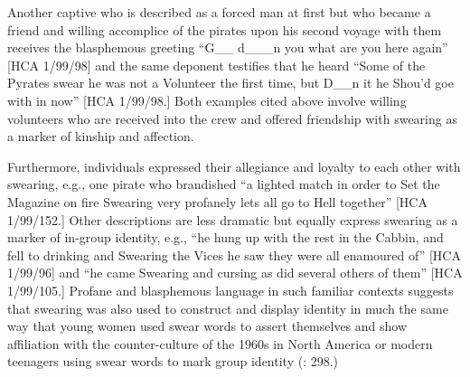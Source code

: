 Another captive who is described as a forced man at first but who became a friend and willing accomplice of the pirates upon his second voyage with them receives the blasphemous greeting “G\_\_ d\_\_\_n you what are you here again” [HCA 1/99/98] and the same deponent testifies that he heard “Some of the Pyrates swear he was not a Volunteer the first time, but D\_\_n it he Shou’d goe with in now” [HCA 1/99/98.] Both examples cited above involve willing volunteers who are received into the crew and offered friendship with swearing as a marker of kinship and affection. 

Furthermore, individuals expressed their allegiance and loyalty to each other with swearing, e.g., one pirate who brandished “a lighted match in order to Set the Magazine on fire Swearing very profanely lets all go to Hell together” [HCA 1/99/152.] Other descriptions are less dramatic but equally express swearing as a marker of in-group identity, e.g., “he hung up with the rest in the Cabbin, and fell to drinking and Swearing the Vices he saw they were all enamoured of” [HCA 1/99/96] and “he came Swearing and cursing as did several others of them” [HCA 1/99/105.] Profane and blasphemous language in such familiar contexts suggests that swearing was also used to construct and display identity in much the same way that young women used swear words to assert themselves and show affiliation with the counter-culture of the 1960s in North America \citep[60]{Carlisle2009} or modern teenagers using swear words to mark group identity (\citealt{Stapleton2010}: 298.) 

